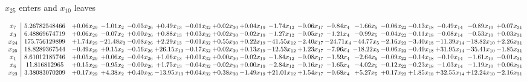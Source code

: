 \documentclass[9pt]{article}
\begin{document}
 $ x_{25} $ enters and $ x_{10} $ leaves 

 \[\begin{array}{c| c c@{\hskip 2pt} c@{\hskip 2pt} c@{\hskip 2pt} c@{\hskip 2pt} c@{\hskip 2pt} c@{\hskip 2pt} c@{\hskip 2pt} c@{\hskip 2pt} c@{\hskip 2pt} c@{\hskip 2pt} c@{\hskip 2pt} c@{\hskip 2pt} c@{\hskip 2pt} c@{\hskip 2pt} c@{\hskip 2pt} c@{\hskip 2pt} }
 x_{7}   &  5.26782548466 & +  0.06 x_{29} & -1.01 x_{2} & -0.05 x_{26} & +  0.49 x_{13} & -0.01 x_{32} & +  0.02 x_{30} & +  0.04 x_{19} & -1.74 x_{12} & -0.06 x_{17} & -0.84 x_{4} & -1.66 x_{5} & -0.06 x_{22} & -0.13 x_{18} & -0.49 x_{14} & -0.89 x_{10} & +  0.07 x_{31}\\
 x_{3}   &  6.48869674719 & +  0.06 x_{29} & -0.07 x_{2} & +  0.00 x_{26} & +  0.88 x_{13} & +  0.03 x_{32} & +  0.02 x_{30} & -0.02 x_{19} & -1.27 x_{12} & -0.05 x_{17} & -1.21 x_{4} & -0.99 x_{5} & -0.04 x_{22} & -0.11 x_{18} & -0.08 x_{14} & -0.53 x_{10} & +  0.03 x_{31}\\
 x_{24}   &  175.756129899 & +  1.74 x_{29} & -21.48 x_{2} & -0.08 x_{26} & +  2.29 x_{13} & -0.01 x_{32} & +  0.55 x_{30} & +  0.22 x_{19} & -41.55 x_{12} & -2.40 x_{17} & -24.71 x_{4} & -44.77 x_{5} & -2.16 x_{22} & -3.40 x_{18} & -11.39 x_{14} & -18.82 x_{10} & +  2.26 x_{31}\\
 x_{25}   &  18.8289367544 & -0.49 x_{29} & +  9.15 x_{2} & -0.56 x_{26} & + 26.15 x_{13} & -0.17 x_{32} & +  0.02 x_{30} & +  0.13 x_{19} & -12.53 x_{12} & +  1.23 x_{17} & -7.96 x_{4} & -18.22 x_{5} & -0.06 x_{22} & -0.49 x_{18} & + 31.95 x_{14} & -35.41 x_{10} & -1.85 x_{31}\\
 x_{1}   &  8.61012185746 & +  0.05 x_{29} & +  0.06 x_{2} & -0.04 x_{26} & +  1.06 x_{13} & +  0.01 x_{32} & +  0.00 x_{30} & -0.02 x_{19} & -1.84 x_{12} & -0.08 x_{17} & -1.59 x_{4} & -2.64 x_{5} & -0.09 x_{22} & -0.14 x_{18} & -0.10 x_{14} & -1.61 x_{10} & -0.01 x_{31}\\
 x_{6}   &  11.816812965 & +  0.15 x_{29} & -0.95 x_{2} & -0.00 x_{26} & +  1.75 x_{13} & -0.04 x_{32} & -0.02 x_{30} & +  0.00 x_{19} & -2.84 x_{12} & -0.16 x_{17} & -1.65 x_{4} & -4.02 x_{5} & -0.12 x_{22} & -0.23 x_{18} & -1.03 x_{14} & -1.19 x_{10} & +  0.06 x_{31}\\
 x_{23}   &  3.38083070209 & +  0.17 x_{29} & +  4.38 x_{2} & +  0.40 x_{26} & -13.95 x_{13} & +  0.04 x_{32} & +  0.38 x_{30} & -1.49 x_{19} & + 21.01 x_{12} & +  1.54 x_{17} & -0.68 x_{4} & +  5.27 x_{5} & +  0.17 x_{22} & +  1.85 x_{18} & + 32.55 x_{14} & + 12.24 x_{10} & -2.16 x_{31}\\

\end{array}\]
\end{document}
